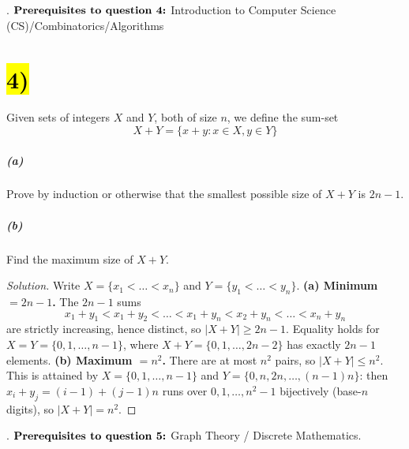 \documentclass[11pt]{article}
\newcommand{\skipnewline}{\vspace*{-\baselineskip}}
\newenvironment{solution}
  {\renewcommand\qedsymbol{$\blacksquare$}\begin{proof}[Solution]}
  {\end{proof}}
\begin{document}

{\color{white}.}\newline
$\text{\bf {Prerequisites to question 4:}}$ Introduction to Computer Science (CS)/Combinatorics/Algorithms
\section*{\hl{4)}} Given sets of integers $X$ and $Y$, both of size $n$, we define the sum-set
$$X + Y = \{ x+y : x \in X, y \in Y\}$$
\subparagraph*{(a)} Prove by induction or otherwise that the smallest possible size of $X + Y$ is $2n - 1$.\skipnewline
\subparagraph*{(b)} Find the maximum size of $X + Y$.
\begin{solution}
Write $X=\{x_1<\dots<x_n\}$ and $Y=\{y_1<\dots<y_n\}$.
\newline
\textbf{(a) Minimum $=2n-1$.} The $2n-1$ sums
$$x_1+y_1<x_1+y_2<\dots<x_1+y_n<x_2+y_n<\dots<x_n+y_n$$
are strictly increasing, hence distinct, so $|X+Y|\ge2n-1$. Equality holds for $X=Y=\{0,1,\dots,n-1\}$, where $X+Y=\{0,1,\dots,2n-2\}$ has exactly $2n-1$ elements.
\newline
\textbf{(b) Maximum $=n^2$.} There are at most $n^2$ pairs, so $|X+Y|\le n^2$. This is attained by $X=\{0,1,\dots,n-1\}$ and $Y=\{0,n,2n,\dots,(n-1)n\}$: then $x_i+y_j=(i-1)+(j-1)n$ runs over $0,1,\dots,n^2-1$ bijectively (base-$n$ digits), so $|X+Y|=n^2$. 
\end{solution}


{\color{white}.}\newline
$\text{\bf {Prerequisites to question 5:}}$ Graph Theory / Discrete Mathematics.
\end{document}
